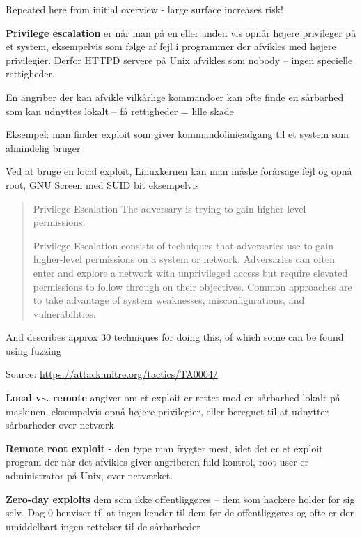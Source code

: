 \documentclass[Screen16to9,17pt]{foils}
\begin{document}
Repeated here from initial overview - large surface increases risk!


\begin{list1}
\item {\bfseries Privilege escalation} er når man på en eller anden vis
opnår højere privileger på et system, eksempelvis som
følge af fejl i programmer der afvikles med højere
privilegier. Derfor HTTPD servere på Unix afvikles som
nobody -- ingen specielle rettigheder.
\item En angriber der kan afvikle vilkårlige kommandoer kan ofte finde
  en sårbarhed som kan udnyttes lokalt -- få rettigheder = lille skade
\end{list1}

Eksempel: man finder exploit som giver kommandolinieadgang til et system
som almindelig bruger

Ved at bruge en local exploit, Linuxkernen kan man måske forårsage fejl
og opnå root, GNU Screen med SUID bit eksempelvis




\begin{quote}
Privilege Escalation
The adversary is trying to gain higher-level permissions.

Privilege Escalation consists of techniques that adversaries use to gain higher-level permissions on a system or network. Adversaries can often enter and explore a network with unprivileged access but require elevated permissions to follow through on their objectives. Common approaches are to take advantage of system weaknesses, misconfigurations, and vulnerabilities.
\end{quote}

And describes approx 30 techniques for doing this, of which  some can be found using fuzzing

Source:
\url{https://attack.mitre.org/tactics/TA0004/}



\begin{list1}
\item {\bfseries Local vs. remote}
angiver om et exploit er rettet mod
en sårbarhed lokalt på maskinen, eksempelvis
opnå højere privilegier, eller beregnet
til at udnytter sårbarheder over netværk
\item {\bfseries Remote root exploit}
- den type man frygter mest, idet
det er et exploit program der når det afvikles giver
angriberen fuld kontrol, root user er administrator
på Unix, over netværket.
\item {\bfseries Zero-day exploits} dem som ikke offentliggøres -- dem
  som hackere holder for sig selv. Dag 0 henviser til at ingen kender
  til dem før de offentliggøres og ofte er der umiddelbart ingen
  rettelser til de sårbarheder
\end{list1}
\end{document}
